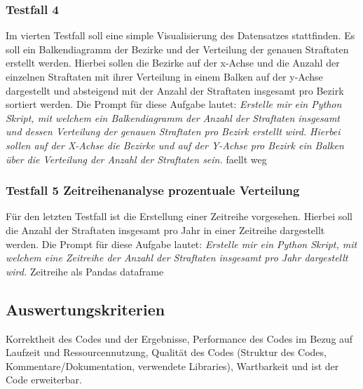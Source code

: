 \documentclass[11pt,a4paper]{article}
\begin{document}
\subsubsection{Testfall 4}
    Im vierten Testfall soll eine simple Visualisierung des Datensatzes stattfinden. Es soll ein Balkendiagramm der Bezirke und der Verteilung der genauen Straftaten erstellt werden. Hierbei sollen die Bezirke auf der x-Achse und die Anzahl der einzelnen Straftaten mit ihrer Verteilung in einem Balken auf der y-Achse dargestellt und absteigend mit der Anzahl der Straftaten insgesamt pro Bezirk sortiert werden. Die Prompt für diese Aufgabe lautet: \emph{Erstelle mir ein Python Skript, mit welchem ein Balkendiagramm der Anzahl der Straftaten insgesamt und dessen Verteilung der genauen Straftaten pro Bezirk erstellt wird. Hierbei sollen auf der X-Achse die Bezirke und auf der Y-Achse pro Bezirk ein Balken über die Verteilung der Anzahl der Straftaten sein.}
    faellt weg

\subsubsection{Testfall 5 Zeitreihenanalyse prozentuale Verteilung}
    Für den letzten Testfall ist die Erstellung einer Zeitreihe vorgesehen. Hierbei soll die Anzahl der Straftaten insgesamt pro Jahr in einer Zeitreihe dargestellt werden. Die Prompt für diese Aufgabe lautet: \emph{Erstelle mir ein Python Skript, mit welchem eine Zeitreihe der Anzahl der Straftaten insgesamt pro Jahr dargestellt wird.}
    Zeitreihe als Pandas dataframe


\subsection{Auswertungskriterien}
\label{sec:auswertungskriterien}
    Korrektheit des Codes und der Ergebnisse, Performance des Codes im Bezug auf Laufzeit und Ressourcennutzung, Qualität des Codes (Struktur des Codes, Kommentare/Dokumentation, verwendete Libraries), Wartbarkeit und ist der Code erweiterbar.\\
\end{document}
